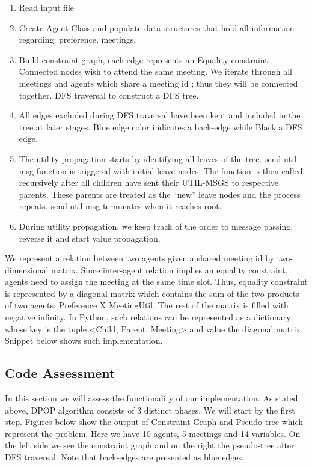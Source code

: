 \documentclass[11pt,a4paper,onecolumn]{article}
\begin{document}
	\begin{enumerate}
		\item Read input file
		\item Create Agent Class and populate data structures that hold all information regarding: preference, meetings.
		\item Build constraint graph, each edge represents an Equality constraint. Connected nodes wish to attend the same meeting. We iterate through all meetings and agents which share a meeting  id ; thus they will be connected together.
		DFS traversal to construct a DFS tree.
		\item All edges excluded during DFS traversal have been kept and included in the tree at later stages. Blue edge color indicates a back-edge while Black a DFS edge.
		\item The utility propagation starts by identifying all leaves of the tree. send-util-msg function is triggered with initial leave nodes. The function is then called recursively after all children have sent their UTIL-MSGS to respective parents. These parents are treated as the “new” leave nodes and the process repeats. send-util-msg terminates when it reaches root.
		\item During utility propagation, we keep track of the order to message passing, reverse it and start value propagation.
	\end{enumerate}
	
	We represent a relation between two agents given a shared meeting id by two-dimensional matrix. Since inter-agent relation implies an equality constraint, agents need to assign the meeting at the same time slot. Thus, equality constraint is represented by a diagonal matrix which contains the sum of the two products of two agents, Preference X MeetingUtil. The rest of the matrix is filled with negative infinity. In Python, such relations can be represented as a dictionary whose key is the tuple <Child, Parent, Meeting> and value the diagonal matrix. Snippet below shows such implementation.
	
	
	\subsection{Code Assessment}
	In this section we will assess the functionality of our implementation. As stated above, DPOP algorithm consists of 3 distinct phases. We will start by the first step. Figures below show the output of Constraint Graph and Pseudo-tree which represent the problem. Here we have 10 agents, 5 meetings and 14 variables. On the left side we see the constraint graph and on the right the pseudo-tree after DFS traversal. Note that back-edges are presented as blue edges.
	
\end{document}
